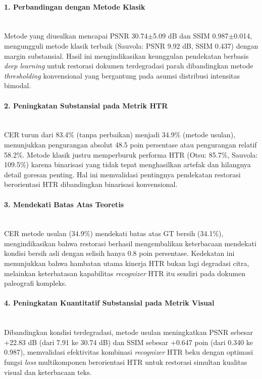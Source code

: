 \documentclass[12pt,a4paper]{article}
\begin{document}
\paragraph{1. Perbandingan dengan Metode Klasik} \mbox{}\\[0.1em]
Metode yang diusulkan mencapai PSNR 30.74$\pm$5.09 dB dan SSIM 0.987$\pm$0.014, mengungguli metode klasik terbaik (Sauvola: PSNR 9.92 dB, SSIM 0.437) dengan margin substansial. Hasil ini mengindikasikan keunggulan pendekatan berbasis \textit{deep learning} untuk restorasi dokumen terdegradasi parah dibandingkan metode \textit{thresholding} konvensional yang bergantung pada asumsi distribusi intensitas bimodal.

\paragraph{2. Peningkatan Substansial pada Metrik HTR} \mbox{}\\[0.1em] 
CER turun dari 83.4\% (tanpa perbaikan) menjadi 34.9\% (metode usulan), menunjukkan pengurangan absolut 48.5 poin persentase atau pengurangan relatif 58.2\%. Metode klasik justru memperburuk performa HTR (Otsu: 85.7\%, Sauvola: 109.5\%) karena binarisasi yang tidak tepat menghasilkan artefak dan hilangnya detail goresan penting. Hal ini memvalidasi pentingnya pendekatan restorasi berorientasi HTR dibandingkan binarisasi konvensional.

\paragraph{3. Mendekati Batas Atas Teoretis} \mbox{}\\[0.1em]
CER metode usulan (34.9\%) mendekati batas atas GT bersih (34.1\%), mengindikasikan bahwa restorasi berhasil mengembalikan keterbacaan mendekati kondisi bersih asli dengan selisih hanya 0.8 poin persentase. Kedekatan ini menunjukkan bahwa hambatan utama kinerja HTR bukan lagi degradasi citra, melainkan keterbatasan kapabilitas \textit{recognizer} HTR itu sendiri pada dokumen paleografi kompleks.

\paragraph{4.  Peningkatan Kuantitatif Substansial pada Metrik Visual} \mbox{}\\[0.1em]
Dibandingkan kondisi terdegradasi, metode usulan meningkatkan PSNR sebesar +22.83 dB (dari 7.91 ke 30.74 dB) dan SSIM sebesar +0.647 poin (dari 0.340 ke 0.987), memvalidasi efektivitas kombinasi \textit{recognizer} HTR beku dengan optimasi fungsi \textit{loss} multikomponen berorientasi HTR untuk restorasi simultan kualitas visual dan keterbacaan teks.
\end{document}
